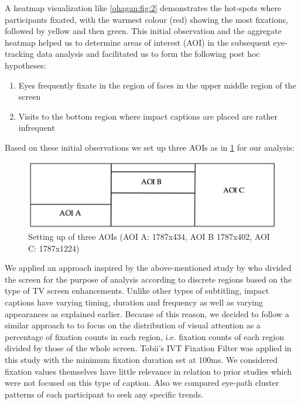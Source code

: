 \documentclass[output=paper]{langsci/langscibook}
\begin{document}
A heatmap visualization like \ref{ohagan:fig:2} demonstrates the hot-spots where participants fixated, with the warmest colour (red) showing the most fixations, followed by yellow and then green. This initial observation and the aggregate heatmap helped us to determine areas of interest (AOI) in the subsequent eye-tracking data analysis and facilitated us to form the following post hoc hypotheses:

\begin{enumerate}
\item Eyes frequently fixate in the region of faces in the upper middle region of the screen
\item Visits to the bottom region where impact captions are placed are rather infrequent
\end{enumerate}

Based on these initial observations we set up three AOIs as in \ref{ohagan:fig:3} for our analysis:

\begin{figure}
 \includegraphics[width=\textwidth]{figures/OHagan3.png}
	\caption{Setting up of three AOIs (AOI A: 1787x434, AOI B 1787x402, AOI C: 1787x1224)}
	\label{ohagan:fig:3}
\end{figure}

We applied an approach inspired by the above-mentioned study by \citet{josephson2006} who divided the screen for the purpose of analysis according to discrete regions based on the type of TV screen enhancements. Unlike other types of subtitling, impact captions have varying timing, duration and frequency as well as varying appearances as explained earlier.  Because of this reason, we decided to follow a similar approach to \citet{josephson2006} to focus on the distribution of visual attention as a percentage of fixation counts in each region, i.e. fixation counts of each region divided by those of the whole screen.  Tobii's IVT Fixation Filter was applied in this study with the minimum fixation duration set at 100ms. We considered fixation values themselves have little relevance in relation to prior studies which were not focused on this type of caption. Also we compared eye-path cluster patterns of each participant to seek any specific trends.  
\end{document}
